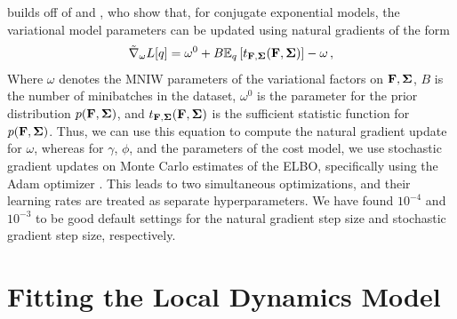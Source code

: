 \citet{Johnson2016} builds off of \citet{Hoffman2013} and \citet{Winn2005}, who show that, for conjugate exponential models, the variational model parameters can be updated using natural gradients of the form
\begin{equation}
    \tilde{\nabla}_{\omega}L[q]=\omega^0+B\mathbb{E}_q\left[t_{\mathbf{F},\bm{\Sigma}}(\mathbf{F},\bm{\Sigma})\right]-\omega\,,
\end{equation}
Where $\omega$ denotes the MNIW parameters of the variational factors on $\mathbf{F},\bm{\Sigma}$, $B$ is the number of minibatches in the dataset, $\omega^0$ is the parameter for the prior distribution $p(\mathbf{F},\bm{\Sigma})$, and $t_{\mathbf{F},\bm{\Sigma}}(\mathbf{F},\bm{\Sigma})$ is the sufficient statistic function for $p(\mathbf{F},\bm{\Sigma})$. Thus, we can use this equation to compute the natural gradient update for $\omega$, whereas for $\gamma$, $\phi$, and the parameters of the cost model, we use stochastic gradient updates on Monte Carlo estimates of the ELBO, specifically using the Adam optimizer \citep{Kingma2014}. This leads to two simultaneous optimizations, and their learning rates are treated as separate hyperparameters. We have found $10^{-4}$ and $10^{-3}$ to be good default settings for the natural gradient step size and stochastic gradient step size, respectively.


\section{Fitting the Local Dynamics Model}
\label{sec:supp-fit}

